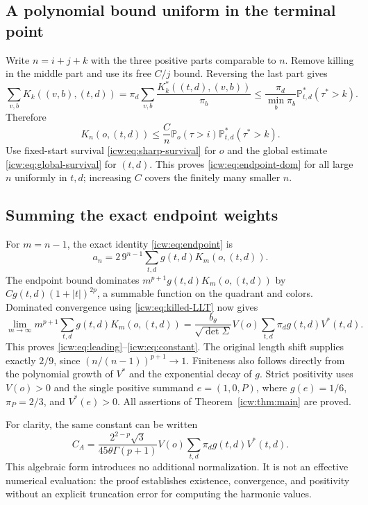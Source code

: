 \documentclass[11pt,letterpaper]{article}
\theoremstyle{remark}\newtheorem{remark}[theorem]{Remark}
\newcommand{\Prob}{\mathbb P}
\newcommand{\1}{\mathbf1}
\newcommand{\dett}{\sqrt{\det\Sigma}}
\begin{document}
\subsection{A polynomial bound uniform in the terminal point}
Write $n=i+j+k$ with the three positive parts comparable to $n$.
Remove killing in the middle part and use its free $C/j$ bound.
Reversing the last part gives
\[
 \sum_{v,b}K_k((v,b),(t,d))
 =\pi_d\sum_{v,b}\frac{K_k^*((t,d),(v,b))}{\pi_b}
 \le\frac{\pi_d}{\min_b\pi_b}\Prob^*_{t,d}(\tau^*>k).
\]
Therefore
\begin{equation}\label{icw:eq:three-way}
 K_n(o,(t,d))\le\frac Cn\Prob_o(\tau>i)
                              \Prob^*_{t,d}(\tau^*>k).
\end{equation}
Use fixed-start survival \eqref{icw:eq:sharp-survival} for $o$ and the
global estimate \eqref{icw:eq:global-survival} for $(t,d)$. This proves
\eqref{icw:eq:endpoint-dom} for all large $n$ uniformly in $t,d$;
increasing $C$ covers the finitely many smaller $n$.

\subsection{Summing the exact endpoint weights}
For $m=n-1$, the exact identity \eqref{icw:eq:endpoint} is
\[
 a_n=2\,9^{n-1}\sum_{t,d}g(t,d)K_m(o,(t,d)).
\]
The endpoint bound dominates
$m^{p+1}g(t,d)K_m(o,(t,d))$ by
$Cg(t,d)(1+|t|)^{2p}$, a summable function on the quadrant and colors.
Dominated convergence using \eqref{icw:eq:killed-LLT} now gives
\[
 \lim_{m\to\infty}m^{p+1}\sum_{t,d}g(t,d)K_m(o,(t,d))
 =\frac{b_\theta}{\dett}V(o)
                       \sum_{t,d}\pi_dg(t,d)V^*(t,d).
\]
This proves \eqref{icw:eq:leading}--\eqref{icw:eq:constant}. The original
length shift supplies exactly $2/9$, since
$(n/(n-1))^{p+1}\to1$. Finiteness also follows directly from the
polynomial growth of $V^*$ and the exponential decay of $g$.
Strict positivity uses $V(o)>0$ and the single positive summand
$e=(1,0,P)$, where $g(e)=1/6$, $\pi_P=2/3$, and $V^*(e)>0$.
All assertions of Theorem~\ref{icw:thm:main} are proved.

For clarity, the same constant can be written
\[
 C_A=\frac{2^{2-p}\sqrt3}{45\theta\Gamma(p+1)}V(o)
                       \sum_{t,d}\pi_dg(t,d)V^*(t,d).
\]
This algebraic form introduces no additional normalization. It is not
an effective numerical evaluation: the proof establishes existence,
convergence, and positivity without an explicit truncation error for
computing the harmonic values.
\end{document}
